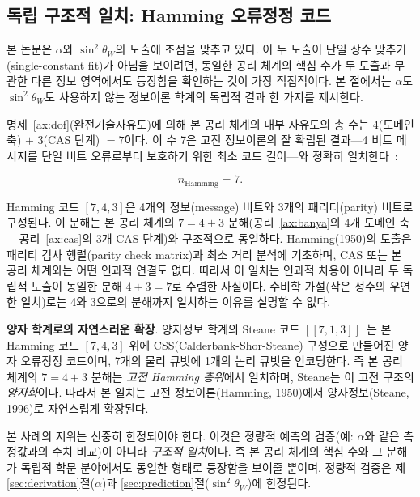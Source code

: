 \documentclass[entropy,article,submit,pdftex,oneauthor]{Definitions/mdpi}
\begin{document}
\subsection{독립 구조적 일치: Hamming 오류정정 코드}
\label{sec:predictions}

본 논문은 $\alpha$와 $\sin^2\theta_W$의 도출에 초점을 맞추고 있다. 이 두 도출이 단일 상수 맞추기(single-constant fit)가 아님을 보이려면, 동일한 공리 체계의 핵심 수가 두 도출과 무관한 다른 정보 영역에서도 등장함을 확인하는 것이 가장 직접적이다. 본 절에서는 $\alpha$도 $\sin^2\theta_W$도 사용하지 않는 정보이론 학계의 독립적 결과 한 가지를 제시한다.

명제~\ref{ax:dof}(완전기술자유도)에 의해 본 공리 체계의 내부 자유도의 총 수는 4(도메인 축) $+$ 3(CAS 단계) $= 7$이다. 이 수 7은 고전 정보이론의 잘 확립된 결과---4 비트 메시지를 단일 비트 오류로부터 보호하기 위한 최소 코드 길이---와 정확히 일치한다~\cite{hamming1950}:
\begin{linenomath}
\begin{equation}
n_{\mathrm{Hamming}} = 7.
\end{equation}
\end{linenomath}
Hamming 코드 $[7, 4, 3]$은 4개의 정보(message) 비트와 3개의 패리티(parity) 비트로 구성된다. 이 분해는 본 공리 체계의 $7 = 4 + 3$ 분해(공리~\ref{ax:banya}의 4개 도메인 축 $+$ 공리~\ref{ax:cas}의 3개 CAS 단계)와 구조적으로 동일하다. Hamming(1950)의 도출은 패리티 검사 행렬(parity check matrix)과 최소 거리 분석에 기초하며, CAS 또는 본 공리 체계와는 어떤 인과적 연결도 없다. 따라서 이 일치는 인과적 차용이 아니라 두 독립적 도출이 동일한 분해 $4+3=7$로 수렴한 사실이다. 수비학 가설(작은 정수의 우연한 일치)로는 4와 3으로의 분해까지 일치하는 이유를 설명할 수 없다.

\textbf{양자 학계로의 자연스러운 확장}. 양자정보 학계의 Steane 코드 $[[7,1,3]]$~\cite{steane1996}는 본 Hamming 코드 $[7,4,3]$ 위에 CSS(Calderbank-Shor-Steane) 구성으로 만들어진 양자 오류정정 코드이며, 7개의 물리 큐빗에 1개의 논리 큐빗을 인코딩한다. 즉 본 공리 체계의 $7 = 4+3$ 분해는 \emph{고전 Hamming 층위}에서 일치하며, Steane는 이 고전 구조의 \emph{양자화}이다. 따라서 본 일치는 고전 정보이론(Hamming, 1950)에서 양자정보(Steane, 1996)로 자연스럽게 확장된다.

본 사례의 지위는 신중히 한정되어야 한다. 이것은 정량적 예측의 검증(예: $\alpha$와 같은 측정값과의 수치 비교)이 아니라 \emph{구조적 일치}이다. 즉 본 공리 체계의 핵심 수와 그 분해가 독립적 학문 분야에서도 동일한 형태로 등장함을 보여줄 뿐이며, 정량적 검증은 제\ref{sec:derivation}절($\alpha$)과 \ref{sec:prediction}절($\sin^2\theta_W$)에 한정된다.
\end{document}
